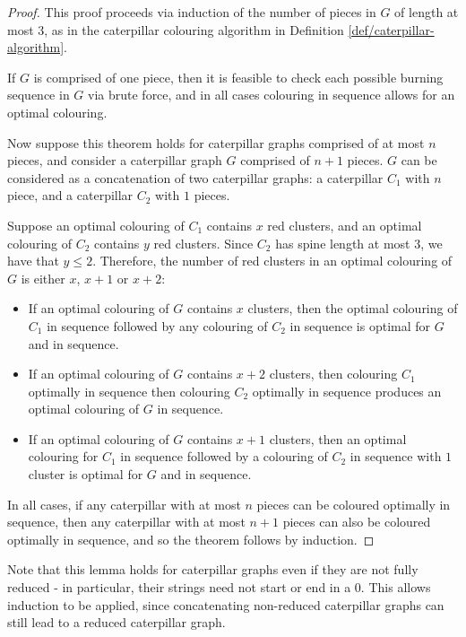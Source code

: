 \documentclass{mpaper}
\begin{document}
\begin{proof}
  This proof proceeds via induction of the number of pieces in $G$ of length at most 3, as in the caterpillar colouring algorithm in Definition \ref{def/caterpillar-algorithm}.
  
  If $G$ is comprised of one piece, then it is feasible to check each possible burning sequence in $G$ via brute force, and in all cases colouring in sequence allows for an optimal colouring.
  
  Now suppose this theorem holds for caterpillar graphs comprised of at most $n$ pieces, and consider a caterpillar graph $G$ comprised of $n+1$ pieces. $G$ can be considered as a concatenation of two caterpillar graphs: a caterpillar $C_1$ with $n$ piece, and a caterpillar $C_2$ with $1$ pieces.
  
  Suppose an optimal colouring of $C_1$ contains $x$ red clusters, and an optimal colouring of $C_2$ contains $y$ red clusters. Since $C_2$ has spine length at most 3, we have that $y \leq 2$. Therefore, the number of red clusters in an optimal colouring of $G$ is either $x$, $x+1$ or $x+2$:
  
  \begin{itemize}
      \item If an optimal colouring of $G$ contains $x$ clusters, then the optimal colouring of $C_1$ in sequence followed by any colouring of $C_2$ in sequence is optimal for $G$ and in sequence.
      \item If an optimal colouring of $G$ contains $x+2$ clusters, then colouring $C_1$ optimally in sequence then colouring $C_2$ optimally in sequence produces an optimal colouring of $G$ in sequence.
      \item If an optimal colouring of $G$ contains $x+1$ clusters, then an optimal colouring for $C_1$ in sequence followed by a colouring of $C_2$ in sequence with $1$ cluster is optimal for $G$ and in sequence.
  \end{itemize}
  
  In all cases, if any caterpillar with at most $n$ pieces can be coloured optimally in sequence, then any caterpillar with at most $n+1$ pieces can also be coloured optimally in sequence, and so the theorem follows by induction.
\end{proof}

Note that this lemma holds for caterpillar graphs even if they are not fully reduced - in particular, their strings need not start or end in a $0$. This allows induction to be applied, since concatenating non-reduced caterpillar graphs can still lead to a reduced caterpillar graph.
\end{document}
